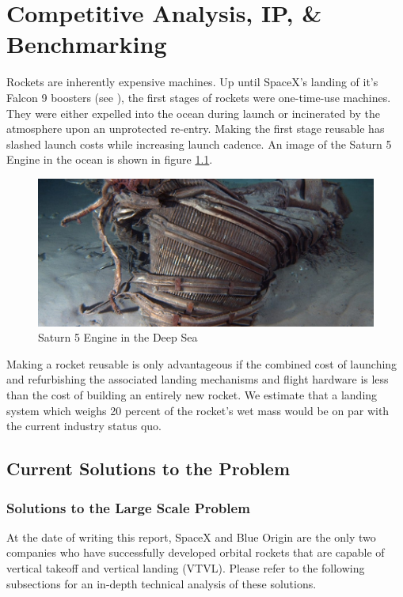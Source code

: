 \chapter{Competitive Analysis, IP, \& Benchmarking}
\label{competitive-analysis}
Rockets are inherently expensive machines. Up until SpaceX's landing of it's Falcon 9 boosters (see \cite{spacex-website}), the first stages of rockets were one-time-use machines. They were either expelled into the ocean during launch or incinerated by the atmosphere upon an unprotected re-entry. Making the first stage reusable has slashed launch costs while increasing launch cadence. An image of the Saturn 5 Engine in the ocean is shown in figure \ref{fig:S5E}.

\begin{figure}[H]
    \centering
    \includegraphics[scale=0.5]{src/figs/Saturn5_In_Ocean.png}
    \caption{Saturn 5 Engine in the Deep Sea}
    \label{fig:S5E}
\end{figure}

Making a rocket reusable is only advantageous if the combined cost of launching and refurbishing the associated landing mechanisms and flight hardware is less than the cost of building an entirely new rocket. We estimate that a landing system which weighs 20 percent of the rocket's wet mass would be on par with the current industry status quo. 

\section{Current Solutions to the Problem}

\subsection{Solutions to the Large Scale Problem}

At the date of writing this report, SpaceX and Blue Origin are the only two companies who have successfully developed orbital rockets that are capable of vertical takeoff and vertical landing (VTVL). Please refer to the following subsections for an in-depth technical analysis of these solutions.

